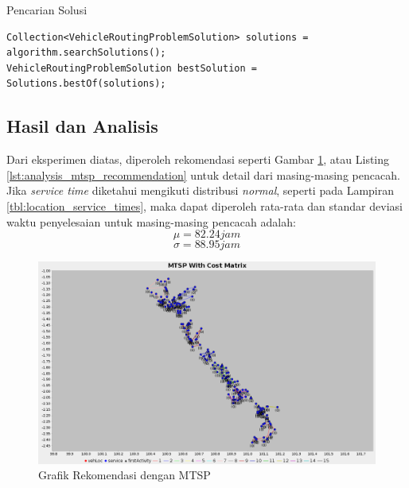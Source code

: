 \begin{listing}[!]
	\caption{Pencarian Solusi}
	\label{lst:jsprit_search_solution}
	\begin{verbatim}
Collection<VehicleRoutingProblemSolution> solutions = algorithm.searchSolutions();
VehicleRoutingProblemSolution bestSolution = Solutions.bestOf(solutions);
	\end{verbatim}
\end{listing}


\subsection{Hasil dan Analisis}
Dari eksperimen diatas, diperoleh rekomendasi seperti Gambar \ref{fig:analysis_mtsp_recommendation}, atau Listing \ref{lst:analysis_mtsp_recommendation} untuk detail dari masing-masing pencacah. Jika \textit{service time} diketahui mengikuti distribusi \textit{normal}, seperti pada Lampiran \ref{tbl:location_service_times}, maka dapat diperoleh rata-rata dan standar deviasi waktu penyelesaian untuk masing-masing pencacah adalah:
$$ \mu = 82.24 jam $$
$$ \sigma = 88.95 jam $$


\begin{figure}[!]
	\centering
	\includegraphics[width=\textwidth]{../../Resources/Images/analysis_mtsp_no_time_windows}
	\caption{Grafik Rekomendasi dengan MTSP}
	\label{fig:analysis_mtsp_recommendation}
\end{figure}


